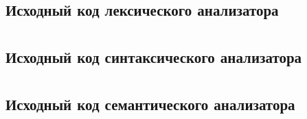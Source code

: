 \documentclass[a4paper,12pt]{article}
\numberwithin{equation}{section}
\begin{document}
\subsection*{Исходный код лексического анализатора}

\clearpage

\section*{} 
\subsection*{Исходный код синтаксического анализатора}

\clearpage

\section*{} 
\subsection*{Исходный код семантического анализатора}

\clearpage
\end{document}
